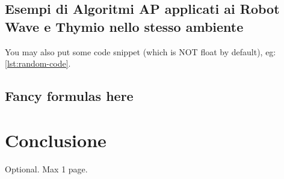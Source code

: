 \documentclass[12pt,a4paper,openright,twoside]{book}
\begin{document}
\section{Esempi di Algoritmi AP applicati ai Robot Wave e Thymio nello stesso ambiente}

You may also put some code snippet (which is NOT float by default), eg: \cref{lst:random-code}.



\section{Fancy formulas here}

\chapter{Conclusione}
\label{chap:conclusione}


\backmatter

\nocite{*} %




\begin{acknowledgements} %
Optional. Max 1 page.
\end{acknowledgements}
\end{document}

